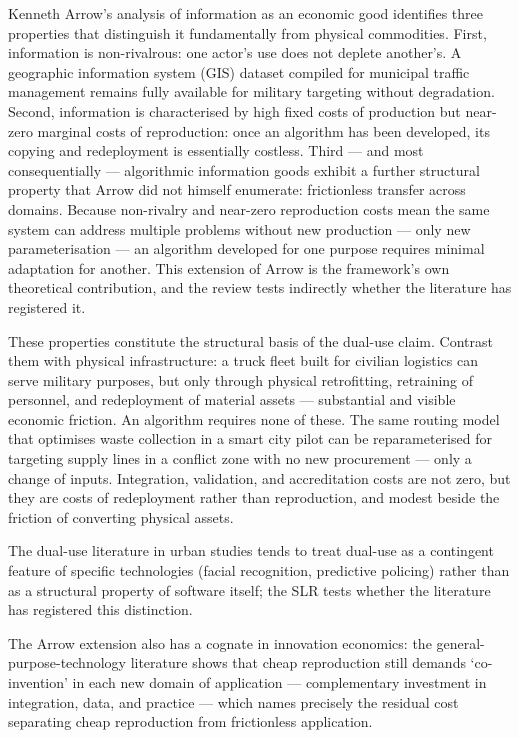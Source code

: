 \documentclass[12pt,a4paper,twoside]{report}
\begin{document}
Kenneth Arrow's \citeyearpar{arrow1962} analysis of information as an economic good identifies three properties that distinguish it fundamentally from physical commodities. First, information is non-rivalrous: one actor's use does not deplete another's. A geographic information system (GIS) dataset compiled for municipal traffic management remains fully available for military targeting without degradation. Second, information is characterised by high fixed costs of production but near-zero marginal costs of reproduction: once an algorithm has been developed, its copying and redeployment is essentially costless. Third — and most consequentially — algorithmic information goods exhibit a further structural property that Arrow did not himself enumerate: frictionless transfer across domains. Because non-rivalry and near-zero reproduction costs mean the same system can address multiple problems without new production — only new parameterisation — an algorithm developed for one purpose requires minimal adaptation for another. This extension of Arrow is the framework's own theoretical contribution, and the review tests indirectly whether the literature has registered it.

These properties constitute the structural basis of the dual-use claim. Contrast them with physical infrastructure: a truck fleet built for civilian logistics can serve military purposes, but only through physical retrofitting, retraining of personnel, and redeployment of material assets — substantial and visible economic friction. An algorithm requires none of these. The same routing model that optimises waste collection in a smart city pilot can be reparameterised for targeting supply lines in a conflict zone with no new procurement — only a change of inputs. Integration, validation, and accreditation costs are not zero, but they are costs of redeployment rather than reproduction, and modest beside the friction of converting physical assets.

The dual-use literature in urban studies tends to treat dual-use as a contingent feature of specific technologies (facial recognition, predictive policing) rather than as a structural property of software itself; the SLR tests whether the literature has registered this distinction.

The Arrow extension also has a cognate in innovation economics: the general-purpose-technology literature \parencite{bresnahan1995} shows that cheap reproduction still demands `co-invention' in each new domain of application — complementary investment in integration, data, and practice — which names precisely the residual cost separating cheap reproduction from frictionless application.
\end{document}
